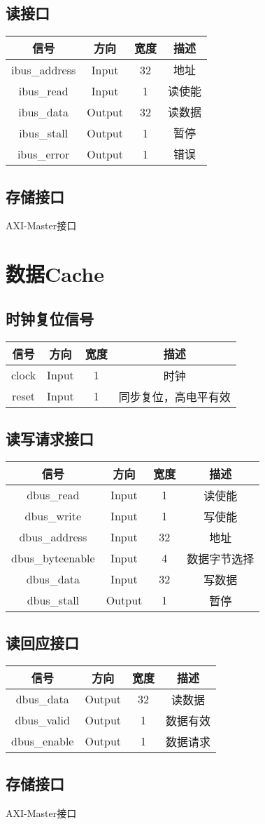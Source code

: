 \documentclass{article}
\newenvironment{signals}{
	\begin{center}
		\begin{tabular}{| c | c | c | c |}
			\hline
			信号 & 方向 & 宽度 & 描述 \\ \hline
}{
		\end{tabular}
	\end{center}
}
\newcommand\sigin{Input}
\newcommand\sigout{Output}
\begin{document}
\subsection{读接口}

\begin{signals}
	ibus\_address & \sigin & 32 & 地址 \\ \hline
	ibus\_read & \sigin & 1 & 读使能 \\ \hline
	ibus\_data & \sigout & 32 & 读数据 \\ \hline
	ibus\_stall & \sigout & 1 & 暂停 \\ \hline
	ibus\_error & \sigout & 1 & 错误 \\ \hline
\end{signals}

\subsection{存储接口}

AXI-Master接口

\section{数据Cache}

\subsection{时钟复位信号}

\begin{signals}
	clock & \sigin & 1 & 时钟 \\ \hline
	reset & \sigin & 1 & 同步复位，高电平有效 \\ \hline
\end{signals}

\subsection{读写请求接口}

\begin{signals}
	dbus\_read & \sigin & 1 & 读使能 \\ \hline
	dbus\_write & \sigin & 1 & 写使能 \\ \hline
	dbus\_address & \sigin & 32 & 地址 \\ \hline
	dbus\_byteenable & \sigin & 4 & 数据字节选择 \\ \hline
	dbus\_data & \sigin & 32 & 写数据 \\ \hline
	dbus\_stall & \sigout & 1 & 暂停 \\ \hline
\end{signals}

\subsection{读回应接口}

\begin{signals}
	dbus\_data & \sigout & 32 & 读数据 \\ \hline
	dbus\_valid & \sigout & 1 & 数据有效 \\ \hline
	dbus\_enable & \sigout & 1 & 数据请求 \\ \hline
\end{signals}

\subsection{存储接口}

AXI-Master接口
\end{document}
